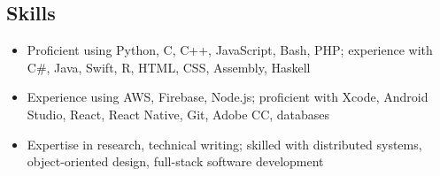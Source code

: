 \documentclass[10pt]{article}
\begin{document}
\begin{raggedright}
        \section*{Skills}

        \begin{itemize}
            \item Proficient using Python, C, C++, JavaScript, Bash, PHP; experience with C\#, Java, Swift, R, HTML, CSS, Assembly, Haskell
            \item Experience using AWS, Firebase, Node.js; proficient with Xcode, Android Studio, React, React Native, Git, Adobe CC, databases
            \item Expertise in research, technical writing; skilled with distributed systems, object-oriented design, full-stack software development
        \end{itemize}

    \end{raggedright}
\end{document}
